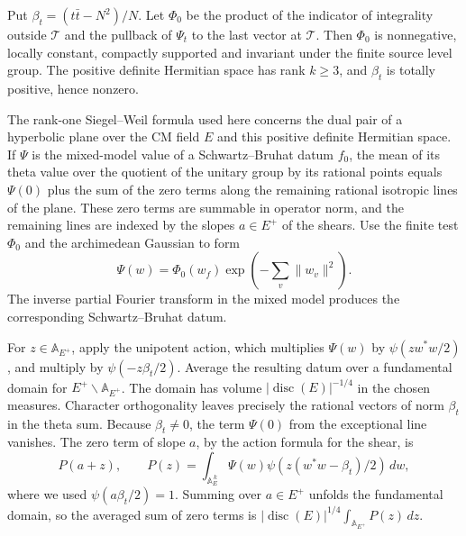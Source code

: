 Put \(\beta_t=(t\bar t-N^2)/N\). Let \(\Phi_0\) be the product of the
indicator of integrality outside \(\mathcal T\) and the pullback of \(\Psi_t\)
to the last vector at \(\mathcal T\).
Then \(\Phi_0\) is nonnegative, locally constant, compactly supported and
invariant under the finite source level group. The positive definite
Hermitian space has rank \(k\ge3\), and \(\beta_t\) is totally positive,
hence nonzero.

The rank-one Siegel--Weil formula used here concerns the dual pair of a
hyperbolic plane over the CM field \(E\) and this positive definite
Hermitian space. If \(\Psi\) is the mixed-model value of a
Schwartz--Bruhat datum \(f_0\), the mean of its theta value over the
quotient of the unitary group by its rational points equals
\(\Psi(0)\) plus the sum of the zero terms along the remaining rational
isotropic lines of the plane. These zero terms are summable in operator
norm, and the remaining lines are indexed by the slopes \(a\in E^+\)
of the shears.
Use the finite test \(\Phi_0\) and the archimedean Gaussian to form
\[
 \Psi(w)=\Phi_0(w_f)\exp\!\left(-\sum_v\|w_v\|^2\right).
\]
The inverse partial Fourier transform in the mixed model produces the
corresponding Schwartz--Bruhat datum.

For \(z\in\mathbb A_{E^+}\), apply the unipotent action, which multiplies
\(\Psi(w)\) by \(\psi(zw^*w/2)\), and multiply by
\(\psi(-z\beta_t/2)\). Average the resulting datum over a fundamental
domain for \(E^+\backslash\mathbb A_{E^+}\).
The domain has volume \(|\operatorname{disc}(E)|^{-1/4}\) in the chosen
measures. Character orthogonality leaves precisely the rational vectors of
norm \(\beta_t\) in the theta sum. Because \(\beta_t\ne0\), the term
\(\Psi(0)\) from the exceptional line vanishes. The zero term of slope
\(a\), by the action formula for the shear, is
\[
 P(a+z),\qquad
 P(z)=\int_{\mathbb A_E^{\,k}}\Psi(w)
             \psi\!\left(z(w^*w-\beta_t)/2\right)\,dw ,
\]
where we used \(\psi(a\beta_t/2)=1\).
Summing over \(a\in E^+\) unfolds the fundamental domain, so the averaged
sum of zero terms is
\(\left|\operatorname{disc}(E)\right|^{1/4}\int_{\mathbb A_{E^+}}P(z)\,dz\).

